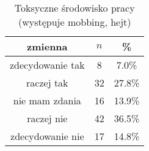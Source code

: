 \begin{table}[H]
\caption{Toksyczne środowisko pracy (występuje mobbing, hejt)}
\centering
\begin{tabular}{ | c | c | c |}
\hline
zmienna & $n$ & \% \\
\hline
zdecydowanie tak  &  8  & 7.0\% \\
\hline
raczej tak  &  32  & 27.8\% \\
\hline
nie mam zdania  &  16  & 13.9\% \\
\hline
raczej nie  &  42  & 36.5\% \\
\hline
zdecydowanie nie  &  17  & 14.8\% \\
\hline
\end{tabular}
\label{tab:Q8}
\end{table}
